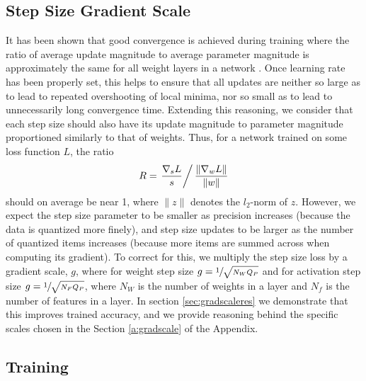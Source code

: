 \documentclass{article}
\begin{document}
\subsection{Step Size Gradient Scale}
\label{methods:gradscale}

It has been shown that good convergence is achieved during training where the ratio of average update magnitude to average parameter magnitude is approximately the same for all weight layers in a network \citep{you2017large}.
Once learning rate has been properly set, this helps to ensure that all updates are neither so large as to lead to repeated overshooting of local minima, nor so small as to lead to unnecessarily long convergence time. 
Extending this reasoning, we consider that each step size should also have its update magnitude to parameter magnitude proportioned similarly to that of weights.
Thus, for a network trained on some loss function $L$, the ratio
\begin{equation}\label{eq:R}
R = 
\left.
\frac{
	\nabla_s L
}{
	s
}
\right/
\frac{
	\lVert \nabla_w L \rVert
}{
	\lVert w \rVert
}
\end{equation}
should on average be near 1, where $\lVert z \rVert$ denotes the $l_2$-norm of $z$. 
However, we expect the step size parameter to be smaller as precision increases (because the data is quantized more finely), and step size updates to be larger as the number of quantized items increases (because more items are summed across when computing its gradient).
To correct for this, we multiply the step size loss by a gradient scale, $g$, where for weight step size $g=\sfrac{1}{\sqrt{N_WQ_P}}$ and for activation step size $g=\sfrac{1}{\sqrt{N_FQ_P}}$, where $N_W$ is the number of weights in a layer and $N_f$ is the number of features in a layer.
In section \ref{sec:gradscaleres} we demonstrate that this improves trained accuracy, and we provide reasoning behind the specific scales chosen in the Section \ref{a:gradscale} of the Appendix.






\subsection{Training}
\label{methods:training}
\end{document}
